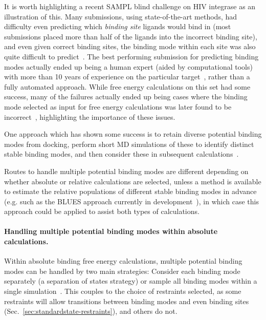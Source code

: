 \documentclass[9pt,bestpractices]{livecoms}
\begin{document}
It is worth highlighting a recent SAMPL blind challenge on HIV integrase as an illustration of this. 
Many submissions, using state-of-the-art methods, had difficulty even predicting which \emph{binding site} ligands would bind in (most submissions placed more than half of the ligands into the incorrect binding site), and even given correct binding sites, the binding mode within each site was also quite difficult to predict~\cite{mobley2014blind}.
The best performing submission for predicting binding modes actually ended up being a human expert (aided by computational tools) with more than 10 years of experience on the particular target~\cite{voet2014combining}, rather than a fully automated approach.
While free energy calculations on this set had some success, many of the failures actually ended up being cases where the binding mode selected as input for free energy calculations was later found to be incorrect~\cite{gallicchio2014virtual}, highlighting the importance of these issues.

One approach which has shown some success is to retain diverse potential binding modes from docking, perform short MD simulations of these to identify distinct stable binding modes, and then consider these in subsequent calculations~\cite{gallicchio2014virtual, mobley2006use,rocklin2013blind, boyce2009predicting, mobley2007predicting}.


Routes to handle multiple potential binding modes are different depending on whether absolute or relative calculations are selected, unless a method is available to estimate the relative populations of different stable binding modes in advance (e.g. such as the BLUES approach currently in development~\cite{gill2018binding}), in which case this approach could be applied to assist both types of calculations.

\paragraph{Handling multiple potential binding modes within absolute calculations.}
Within absolute binding free energy calculations, multiple potential binding modes can be handled by two main strategies: Consider each binding mode separately (a separation of states strategy) or sample all binding modes within a single simulation~\cite{mobley2012perspective}.
This couples to the choice of restraints selected, as some restraints will allow transitions between binding modes and even binding sites (Sec.~\ref{sec:standardstate-restraints}), and others do not.
\end{document}
